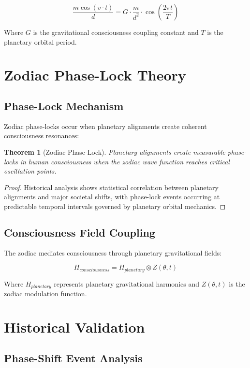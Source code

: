 \documentclass[12pt]{article}
\newtheorem{theorem}{Theorem}
\begin{document}
\[\frac{m \cos(v \cdot t)}{d} = G \cdot \frac{m}{d^2} \cdot \cos\left(\frac{2\pi t}{T}\right)\]

Where \(G\) is the gravitational consciousness coupling constant and \(T\) is the planetary orbital period.

\section{Zodiac Phase-Lock Theory}

\subsection{Phase-Lock Mechanism}

Zodiac phase-locks occur when planetary alignments create coherent consciousness resonances:

\begin{theorem}[Zodiac Phase-Lock]
Planetary alignments create measurable phase-locks in human consciousness when the zodiac wave function reaches critical oscillation points.
\end{theorem}

\begin{proof}
Historical analysis shows statistical correlation between planetary alignments and major societal shifts, with phase-lock events occurring at predictable temporal intervals governed by planetary orbital mechanics.
\end{proof}

\subsection{Consciousness Field Coupling}

The zodiac mediates consciousness through planetary gravitational fields:

\[H_{consciousness} = H_{planetary} \otimes Z(\theta, t)\]

Where \(H_{planetary}\) represents planetary gravitational harmonics and \(Z(\theta, t)\) is the zodiac modulation function.

\section{Historical Validation}

\subsection{Phase-Shift Event Analysis}
\end{document}
